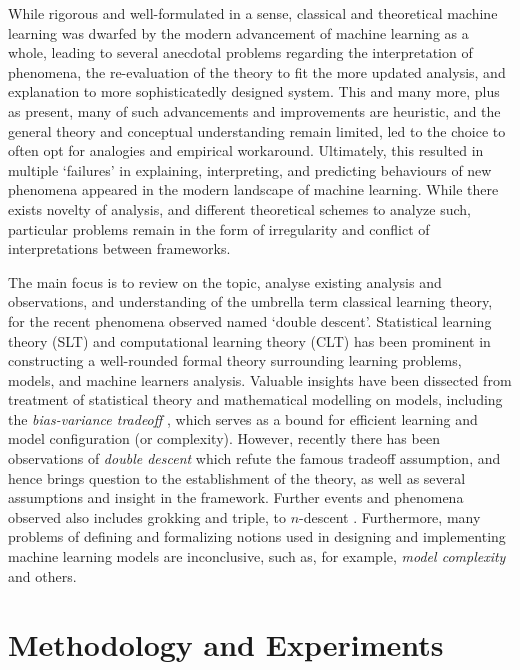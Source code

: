 \documentclass[
  journal=largetwo,
  year=2025,
  volume=37,
]{cup-journal}
\begin{document}
While rigorous and well-formulated in a sense, classical and theoretical machine learning was dwarfed by the modern advancement of machine learning as a whole, leading to several anecdotal problems regarding the interpretation of phenomena, the re-evaluation of the theory to fit the more updated analysis, and explanation to more sophisticatedly designed system. This and many more, plus as present, many of such advancements and improvements are heuristic, and the general theory and conceptual understanding remain limited, led to the choice to often opt for analogies and empirical workaround. Ultimately, this resulted in multiple `failures' in explaining, interpreting, and predicting behaviours of new phenomena appeared in the modern landscape of machine learning. While there exists novelty of analysis, and different theoretical schemes to analyze such, particular problems remain in the form of irregularity and conflict of interpretations between frameworks. 

The main focus is to review on the topic, analyse existing analysis and observations, and understanding of the umbrella term classical learning theory, for the recent phenomena observed named `double descent'. Statistical learning theory (SLT) and computational learning theory (CLT) \cite{Vapnik1999-VAPTNO,10.5555/2371238,10.5555/2621980,STL_Hajek_Maxim_2021,bousquet2020theoryuniversallearning} has been prominent in constructing a well-rounded formal theory surrounding learning problems, models, and machine learners analysis. Valuable insights have been dissected from treatment of statistical theory and mathematical modelling on models, including the \textit{bias-variance tradeoff} \cite{6797087,Domingos2000AUB}, which serves as a bound for efficient learning and model configuration (or complexity). However, recently there has been observations of \textit{double descent} \cite{belkin_reconciling_2019,schaeffer_double_2023,nakkiran_deep_2019,lafon_understanding_2024} which refute the famous tradeoff assumption, and hence brings question to the establishment of the theory, as well as several assumptions and insight in the framework. Further events and phenomena observed also includes grokking and triple, to $n$-descent \cite{davies_unifying_2023,d_ascoli_triple_2020}. Furthermore, many problems of defining and formalizing notions used in designing and implementing machine learning models are inconclusive, such as, for example, \textit{model complexity} and others. 


\section{Methodology and Experiments}
\end{document}
